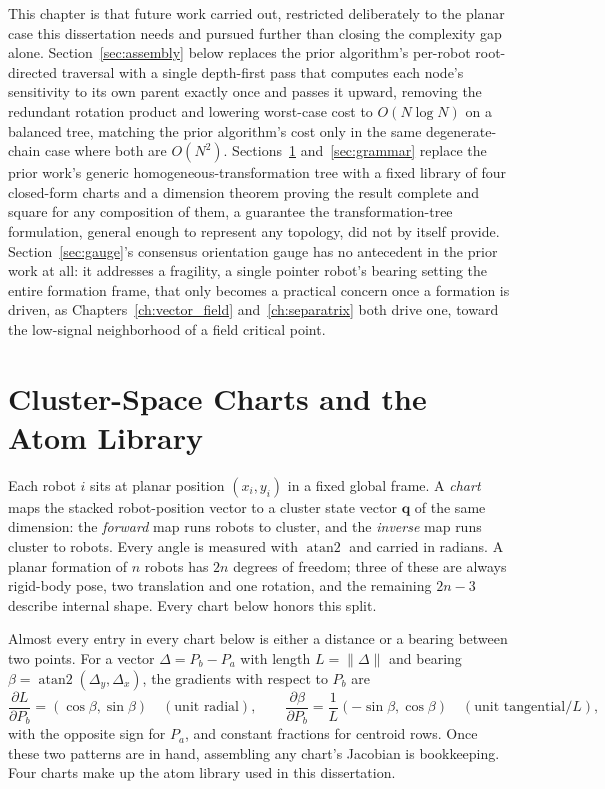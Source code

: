 \documentclass[12pt, letterpaper, oneside]{report}
\begin{document}
This chapter is that future work carried out, restricted deliberately to the
planar case this dissertation needs and pursued further than closing the
complexity gap alone. Section~\ref{sec:assembly} below replaces the prior
algorithm's per-robot root-directed traversal with a single depth-first pass
that computes each node's sensitivity to its own parent exactly once and
passes it upward, removing the redundant rotation product and lowering
worst-case cost to $O(N\log N)$ on a balanced tree, matching the prior
algorithm's cost only in the same degenerate-chain case where both are
$O(N^2)$. Sections~\ref{sec:atoms} and~\ref{sec:grammar} replace the prior
work's generic homogeneous-transformation tree with a fixed library of four
closed-form charts and a dimension theorem proving the result complete and
square for any composition of them, a guarantee the transformation-tree
formulation, general enough to represent any topology, did not by itself
provide. Section~\ref{sec:gauge}'s consensus orientation gauge has no
antecedent in the prior work at all: it addresses a fragility, a single
pointer robot's bearing setting the entire formation frame, that only
becomes a practical concern once a formation is driven, as
Chapters~\ref{ch:vector_field} and~\ref{ch:separatrix} both drive one,
toward the low-signal neighborhood of a field critical point.

\section{Cluster-Space Charts and the Atom Library}
\label{sec:atoms}

Each robot $i$ sits at planar position $(x_i,y_i)$ in a fixed global frame.
A \emph{chart} maps the stacked robot-position vector to a cluster state
vector $\mathbf{q}$ of the same dimension: the \emph{forward} map runs
robots to cluster, and the \emph{inverse} map runs cluster to robots. Every
angle is measured with $\operatorname{atan2}$ and carried in radians. A
planar formation of $n$ robots has $2n$ degrees of freedom; three of these
are always rigid-body pose, two translation and one rotation, and the
remaining $2n-3$ describe internal shape. Every chart below honors this
split.

Almost every entry in every chart below is either a distance or a bearing
between two points. For a vector $\Delta = P_b - P_a$ with length
$L=\lVert\Delta\rVert$ and bearing $\beta=\operatorname{atan2}(\Delta_y,\Delta_x)$,
the gradients with respect to $P_b$ are
\begin{equation}
\frac{\partial L}{\partial P_b} = (\cos\beta,\sin\beta) \quad (\text{unit radial}),
\qquad
\frac{\partial \beta}{\partial P_b} = \frac{1}{L}(-\sin\beta,\cos\beta) \quad (\text{unit tangential}/L),
\label{eq:grads}
\end{equation}
with the opposite sign for $P_a$, and constant fractions for centroid rows.
Once these two patterns are in hand, assembling any chart's Jacobian is
bookkeeping. Four charts make up the atom library used in this dissertation.
\end{document}
